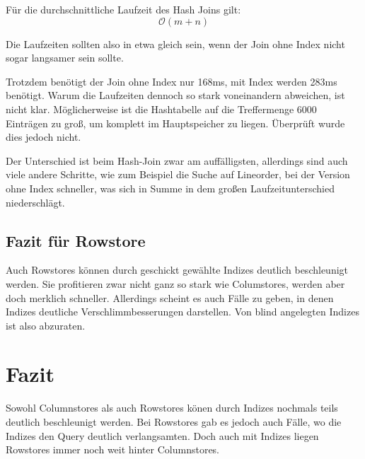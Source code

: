 Für die durchschnittliche Laufzeit des  Hash Joins gilt:\cite{hash}
\begin{equation}
    \mathcal{O}(m+n)
\end{equation}

Die Laufzeiten sollten also in etwa gleich sein, wenn der Join ohne Index nicht sogar langsamer sein sollte.

Trotzdem benötigt der Join ohne Index nur 168ms, mit Index werden 283ms benötigt.
Warum die Laufzeiten dennoch so stark voneinandern abweichen, ist nicht klar. Möglicherweise ist 
die Hashtabelle auf die Treffermenge 6000 Einträgen zu groß, um komplett im Hauptspeicher zu liegen.
Überprüft wurde dies jedoch nicht.

Der Unterschied ist beim Hash-Join zwar am auffälligsten, allerdings sind auch viele andere Schritte, wie zum Beispiel die Suche auf Lineorder, bei der Version ohne Index schneller, was sich in Summe in dem großen Laufzeitunterschied niederschlägt.


\subsection{Fazit für Rowstore}
Auch Rowstores können durch geschickt gewählte Indizes deutlich beschleunigt werden. Sie profitieren zwar nicht ganz so stark wie Columstores, werden aber doch merklich schneller.  
Allerdings scheint es auch Fälle zu geben, in denen Indizes deutliche Verschlimmbesserungen darstellen. Von blind angelegten Indizes ist also abzuraten.

\section{Fazit}
Sowohl Columnstores als auch Rowstores könen durch Indizes nochmals teils deutlich 
beschleunigt werden. Bei Rowstores gab es jedoch auch Fälle, wo die Indizes den Query deutlich verlangsamten.
Doch auch mit Indizes liegen Rowstores immer noch weit hinter Columnstores. 